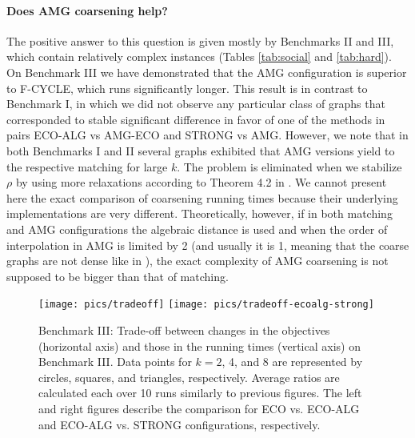 \documentclass{llncs}
\begin{document}
\paragraph{Does AMG coarsening help?} The positive answer to this question is given mostly by Benchmarks II and III, which contain relatively complex instances (Tables \ref{tab:social} and \ref{tab:hard}). 
On Benchmark III we have demonstrated that the AMG configuration is superior to F-CYCLE, which runs significantly longer. 
This result is in contrast to Benchmark I, in which we did not observe any particular class of graphs that corresponded to stable significant difference in favor of one of the methods in pairs ECO-ALG vs AMG-ECO and STRONG vs AMG. However, we note that in both Benchmarks I and II several graphs exhibited that AMG versions yield to the respective matching for large $k$. The problem is eliminated when we stabilize $\rho$ by using more relaxations according to Theorem 4.2 in \cite{safro:relaxml}.
We cannot present here the exact comparison of coarsening running times because their underlying implementations are very different. Theoretically, however, if in both matching and AMG configurations the algebraic distance is used and when the order of interpolation in AMG is limited by 2 (and usually it is 1, meaning that the coarse graphs are not dense like in 
\cite{ChevalierS09}), the exact complexity of AMG coarsening is not supposed to be bigger than that of matching. 
\begin{figure}[t]
\vspace*{-.5cm}
\centering
\texttt{[image: pics/tradeoff]} \hspace{-.5cm}
 \texttt{[image: pics/tradeoff-ecoalg-strong]}\vspace*{-.5cm}
\caption{Benchmark III: Trade-off between changes in the objectives (horizontal axis) and those in the running times (vertical axis) on Benchmark III. Data points for $k=2$, 4, and 8 are represented by circles, squares, and triangles, respectively. Average ratios are calculated each over 10 runs similarly to previous figures. The left and right figures describe the comparison for ECO vs. ECO-ALG and ECO-ALG vs. STRONG configurations, respectively.}\label{fig:hard-tradeoff}
                        \vspace*{-.5cm}
\end{figure}
\end{document}
